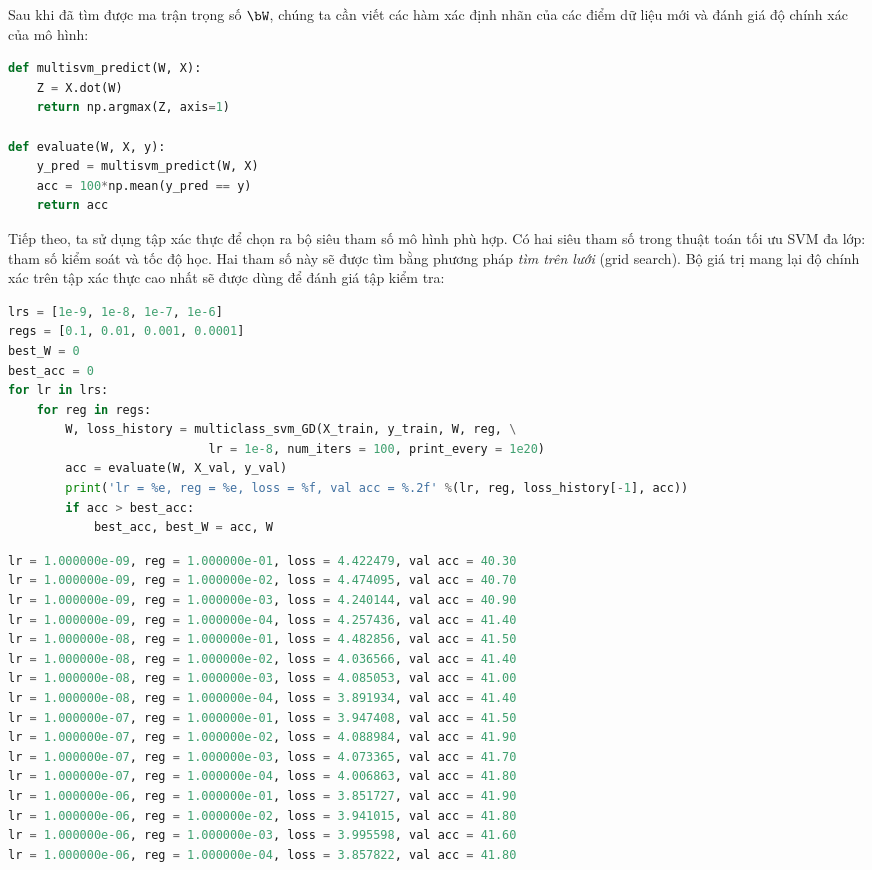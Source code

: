 
Sau khi đã tìm được ma trận trọng số $\bW$,
chúng ta cần viết các hàm xác định nhãn của các điểm dữ liệu mới và đánh giá độ chính xác của mô hình:
\begin{lstlisting}[language=Python]
def multisvm_predict(W, X):
    Z = X.dot(W)
    return np.argmax(Z, axis=1)

def evaluate(W, X, y):
    y_pred = multisvm_predict(W, X)
    acc = 100*np.mean(y_pred == y)
    return acc 
\end{lstlisting}

Tiếp theo, ta sử dụng tập xác thực để chọn ra bộ siêu tham số mô hình phù
hợp. Có hai siêu tham số trong thuật toán tối ưu SVM đa lớp: tham số kiểm soát và tốc độ học. Hai tham số này sẽ được tìm
bằng phương pháp \textit{tìm trên lưới} (grid search). Bộ giá trị mang lại độ chính xác trên tập xác thực cao nhất sẽ được dùng để đánh giá tập kiểm tra:
\begin{lstlisting}[language=Python]
lrs = [1e-9, 1e-8, 1e-7, 1e-6]
regs = [0.1, 0.01, 0.001, 0.0001]
best_W = 0
best_acc = 0
for lr in lrs:
    for reg in regs: 
        W, loss_history = multiclass_svm_GD(X_train, y_train, W, reg, \
                            lr = 1e-8, num_iters = 100, print_every = 1e20)
        acc = evaluate(W, X_val, y_val)
        print('lr = %e, reg = %e, loss = %f, val acc = %.2f' %(lr, reg, loss_history[-1], acc))
        if acc > best_acc:
            best_acc, best_W = acc, W
\end{lstlisting}
\kq 
\begin{lstlisting}[language=Python]
lr = 1.000000e-09, reg = 1.000000e-01, loss = 4.422479, val acc = 40.30
lr = 1.000000e-09, reg = 1.000000e-02, loss = 4.474095, val acc = 40.70
lr = 1.000000e-09, reg = 1.000000e-03, loss = 4.240144, val acc = 40.90
lr = 1.000000e-09, reg = 1.000000e-04, loss = 4.257436, val acc = 41.40
lr = 1.000000e-08, reg = 1.000000e-01, loss = 4.482856, val acc = 41.50
lr = 1.000000e-08, reg = 1.000000e-02, loss = 4.036566, val acc = 41.40
lr = 1.000000e-08, reg = 1.000000e-03, loss = 4.085053, val acc = 41.00
lr = 1.000000e-08, reg = 1.000000e-04, loss = 3.891934, val acc = 41.40
lr = 1.000000e-07, reg = 1.000000e-01, loss = 3.947408, val acc = 41.50
lr = 1.000000e-07, reg = 1.000000e-02, loss = 4.088984, val acc = 41.90
lr = 1.000000e-07, reg = 1.000000e-03, loss = 4.073365, val acc = 41.70
lr = 1.000000e-07, reg = 1.000000e-04, loss = 4.006863, val acc = 41.80
lr = 1.000000e-06, reg = 1.000000e-01, loss = 3.851727, val acc = 41.90
lr = 1.000000e-06, reg = 1.000000e-02, loss = 3.941015, val acc = 41.80
lr = 1.000000e-06, reg = 1.000000e-03, loss = 3.995598, val acc = 41.60
lr = 1.000000e-06, reg = 1.000000e-04, loss = 3.857822, val acc = 41.80
\end{lstlisting}
